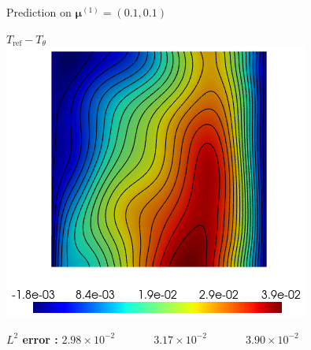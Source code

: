 \begin{frame}{Prediction on $\bm{\mu}^{(1)} = (0.1,0.1)$}
\begin{minipage}{0.26\linewidth}
    \end{minipage} \; \begin{minipage}{0.26\linewidth}
        \centering
        $T_\text{ref}-T_\theta$ \\
        \includegraphics[width=0.95\linewidth]{images/pinn/training/PINN_error_plot_case4_v2_param1_T.png}
    \end{minipage}

    \vspace{8pt}

    \textbf{$L^2$ error :} \hspace{25pt} $2.98\times10^{-2} \hspace{42pt} 3.17\times10^{-2} \hspace{42pt}  3.90\times10^{-2}$

\end{frame}